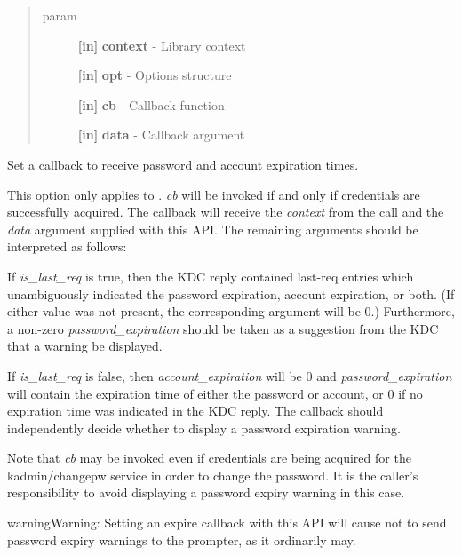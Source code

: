 \documentclass[letterpaper,10pt,english]{sphinxmanual}
\begin{document}
\begin{quote}\begin{description}
\item[{param}] \leavevmode
\textbf{{[}in{]}} \textbf{context} - Library context

\textbf{{[}in{]}} \textbf{opt} - Options structure

\textbf{{[}in{]}} \textbf{cb} - Callback function

\textbf{{[}in{]}} \textbf{data} - Callback argument

\end{description}\end{quote}

Set a callback to receive password and account expiration times.

This option only applies to {\hyperref[appdev/refs/api/krb5_get_init_creds_password:c.krb5_get_init_creds_password]{}} . \emph{cb} will be invoked if and only if credentials are successfully acquired. The callback will receive the \emph{context} from the {\hyperref[appdev/refs/api/krb5_get_init_creds_password:c.krb5_get_init_creds_password]{}} call and the \emph{data} argument supplied with this API. The remaining arguments should be interpreted as follows:

If \emph{is\_last\_req} is true, then the KDC reply contained last-req entries which unambiguously indicated the password expiration, account expiration, or both. (If either value was not present, the corresponding argument will be 0.) Furthermore, a non-zero \emph{password\_expiration} should be taken as a suggestion from the KDC that a warning be displayed.

If \emph{is\_last\_req} is false, then \emph{account\_expiration} will be 0 and \emph{password\_expiration} will contain the expiration time of either the password or account, or 0 if no expiration time was indicated in the KDC reply. The callback should independently decide whether to display a password expiration warning.

Note that \emph{cb} may be invoked even if credentials are being acquired for the kadmin/changepw service in order to change the password. It is the caller's responsibility to avoid displaying a password expiry warning in this case.

\begin{notice}{warning}{Warning:}
Setting an expire callback with this API will cause {\hyperref[appdev/refs/api/krb5_get_init_creds_password:c.krb5_get_init_creds_password]{}} not to send password expiry warnings to the prompter, as it ordinarily may.
\end{notice}
\end{document}
